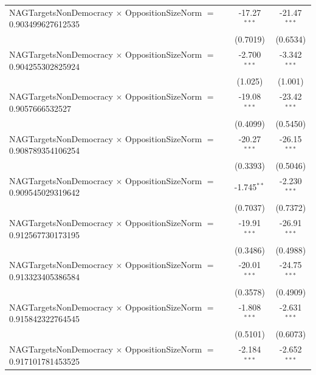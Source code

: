 \begin{tabular}{lcc}
   NAGTargetsNonDemocracy $\times$ OppositionSizeNorm $=$ 0.903499627612535     & -17.27$^{***}$       & -21.47$^{***}$\\   
                                                                                & (0.7019)             & (0.6534)\\   
   NAGTargetsNonDemocracy $\times$ OppositionSizeNorm $=$ 0.904255302825924     & -2.700$^{***}$       & -3.342$^{***}$\\   
                                                                                & (1.025)              & (1.001)\\   
   NAGTargetsNonDemocracy $\times$ OppositionSizeNorm $=$ 0.9057666532527       & -19.08$^{***}$       & -23.42$^{***}$\\   
                                                                                & (0.4099)             & (0.5450)\\   
   NAGTargetsNonDemocracy $\times$ OppositionSizeNorm $=$ 0.908789354106254     & -20.27$^{***}$       & -26.15$^{***}$\\   
                                                                                & (0.3393)             & (0.5046)\\   
   NAGTargetsNonDemocracy $\times$ OppositionSizeNorm $=$ 0.909545029319642     & -1.745$^{**}$        & -2.230$^{***}$\\   
                                                                                & (0.7037)             & (0.7372)\\   
   NAGTargetsNonDemocracy $\times$ OppositionSizeNorm $=$ 0.912567730173195     & -19.91$^{***}$       & -26.91$^{***}$\\   
                                                                                & (0.3486)             & (0.4988)\\   
   NAGTargetsNonDemocracy $\times$ OppositionSizeNorm $=$ 0.913323405386584     & -20.01$^{***}$       & -24.75$^{***}$\\   
                                                                                & (0.3578)             & (0.4909)\\   
   NAGTargetsNonDemocracy $\times$ OppositionSizeNorm $=$ 0.915842322764545     & -1.808$^{***}$       & -2.631$^{***}$\\   
                                                                                & (0.5101)             & (0.6073)\\   
   NAGTargetsNonDemocracy $\times$ OppositionSizeNorm $=$ 0.917101781453525     & -2.184$^{***}$       & -2.652$^{***}$\\   

\end{tabular}
